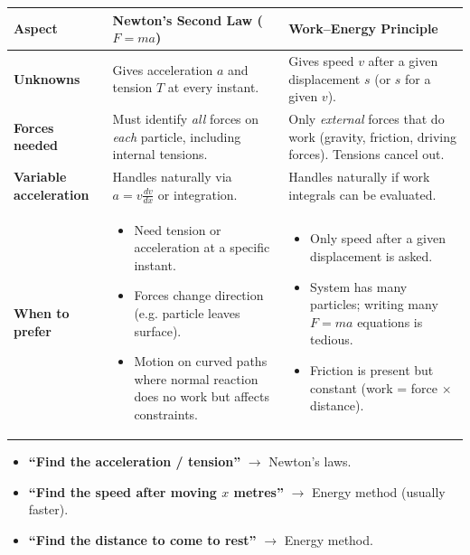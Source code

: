 \documentclass[11pt]{article}
\begin{document}
\begin{center}
\begin{tabularx}{\linewidth}{|l|X|X|}\hline
\textbf{Aspect} & \textbf{Newton's Second Law ($F=ma$)} & \textbf{Work–Energy Principle} \\ \hline
\textbf{Unknowns} & Gives acceleration $a$ and tension $T$ at every instant. & Gives speed $v$ after a given displacement $s$ (or $s$ for a given $v$). \\ \hline
\textbf{Forces needed} & Must identify \emph{all} forces on \emph{each} particle, including internal tensions. & Only \emph{external} forces that do work (gravity, friction, driving forces). Tensions cancel out. \\ \hline
\textbf{Variable acceleration} & Handles naturally via $a = v\frac{dv}{dx}$ or integration. & Handles naturally if work integrals can be evaluated. \\ \hline
\textbf{When to prefer} & \begin{itemize}\item Need tension or acceleration at a specific instant.\item Forces change direction (e.g. particle leaves surface).\item Motion on curved paths where normal reaction does no work but affects constraints.\end{itemize} & \begin{itemize}\item Only speed after a given displacement is asked.\item System has many particles; writing many $F=ma$ equations is tedious.\item Friction is present but constant (work = force $\times$ distance).\end{itemize} \\ \hline
\end{tabularx}
\end{center}

\begin{aretenir}
\begin{itemize}
\item \textbf{``Find the acceleration / tension''} $\rightarrow$ Newton's laws.
\item \textbf{``Find the speed after moving $x$ metres''} $\rightarrow$ Energy method (usually faster).
\item \textbf{``Find the distance to come to rest''} $\rightarrow$ Energy method.
\end{itemize}
\end{aretenir}
\end{document}
